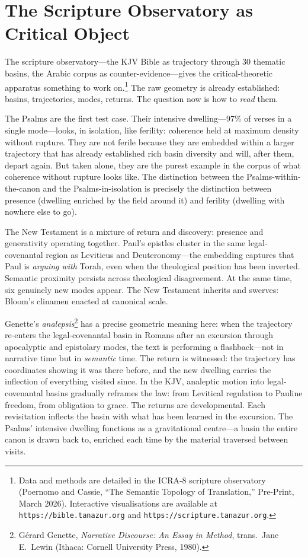 \section{The Scripture Observatory as Critical Object}

The scripture observatory---the KJV Bible as trajectory through 30 thematic basins, the Arabic corpus as counter-evidence---gives the critical-theoretic apparatus something to work on.\footnote{Data and methods are detailed in the ICRA-8 scripture observatory (Poernomo and Cassie, ``The Semantic Topology of Translation,'' Pre-Print, March 2026). Interactive visualisations are available at \texttt{https://bible.tanazur.org} and \texttt{https://scripture.tanazur.org}.} The raw geometry is already established: basins, trajectories, modes, returns. The question now is how to \emph{read} them.

The Psalms are the first test case. Their intensive dwelling---97\% of verses in a single mode---looks, in isolation, like ferility: coherence held at maximum density without rupture. They are not ferile because they are embedded within a larger trajectory that has already established rich basin diversity and will, after them, depart again. But taken alone, they are the purest example in the corpus of what coherence without rupture looks like. The distinction between the Psalms-within-the-canon and the Psalms-in-isolation is precisely the distinction between presence (dwelling enriched by the field around it) and ferility (dwelling with nowhere else to go).

The New Testament is a mixture of return and discovery: presence and generativity operating together. Paul's epistles cluster in the same legal-covenantal region as Leviticus and Deuteronomy---the embedding captures that Paul is \emph{arguing with} Torah, even when the theological position has been inverted. Semantic proximity persists across theological disagreement. At the same time, six genuinely new modes appear. The New Testament inherits and swerves: Bloom's clinamen enacted at canonical scale.

Genette's \emph{analepsis}\footnote{G\'{e}rard Genette, \emph{Narrative Discourse: An Essay in Method}, trans.\ Jane E.\ Lewin (Ithaca: Cornell University Press, 1980).} has a precise geometric meaning here: when the trajectory re-enters the legal-covenantal basin in Romans after an excursion through apocalyptic and epistolary modes, the text is performing a flashback---not in narrative time but in \emph{semantic} time. The return is witnessed: the trajectory has coordinates showing it was there before, and the new dwelling carries the inflection of everything visited since. In the KJV, analeptic motion into legal-covenantal basins gradually reframes the law: from Levitical regulation to Pauline freedom, from obligation to grace. The returns are developmental. Each revisitation inflects the basin with what has been learned in the excursion. The Psalms' intensive dwelling functions as a gravitational centre---a basin the entire canon is drawn back to, enriched each time by the material traversed between visits.

